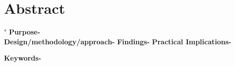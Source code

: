 \newpage

\section*{Abstract}
\color{white}"\color{black}
\textbf{Purpose-} 
\\ \textbf{Design/methodology/approach-} 
\textbf{Findings-}
\textbf{Practical Implications-} 

\textbf{Keywords-} 


